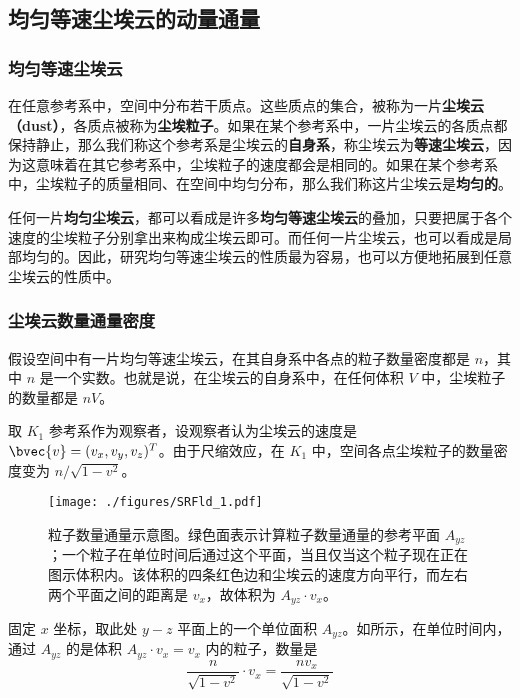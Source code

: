 



\subsection{均匀等速尘埃云的动量通量}

\subsubsection{均匀等速尘埃云}

在任意参考系中，空间中分布若干质点。这些质点的集合，被称为一片\textbf{尘埃云（dust）}，各质点被称为\textbf{尘埃粒子}。如果在某个参考系中，一片尘埃云的各质点都保持静止，那么我们称这个参考系是尘埃云的\textbf{自身系}，称尘埃云为\textbf{等速尘埃云}，因为这意味着在其它参考系中，尘埃粒子的速度都会是相同的。如果在某个参考系中，尘埃粒子的质量相同、在空间中均匀分布，那么我们称这片尘埃云是\textbf{均匀的}。

任何一片\textbf{均匀尘埃云}，都可以看成是许多\textbf{均匀等速尘埃云}的叠加，只要把属于各个速度的尘埃粒子分别拿出来构成尘埃云即可。而任何一片尘埃云，也可以看成是局部均匀的。因此，研究均匀等速尘埃云的性质最为容易，也可以方便地拓展到任意尘埃云的性质中。

\subsubsection{尘埃云数量通量密度}

假设空间中有一片均匀等速尘埃云，在其自身系中各点的粒子数量密度都是 $n$，其中 $n$ 是一个实数。也就是说，在尘埃云的自身系中，在任何体积 $V$ 中，尘埃粒子的数量都是 $nV$。

取 $K_1$ 参考系作为观察者，设观察者认为尘埃云的速度是 $\bvec{v}=(v_x, v_y, v_z)^T$。由于尺缩效应，在 $K_1$ 中，空间各点尘埃粒子的数量密度变为 $n/\sqrt{1-v^2}$。

\begin{figure}[ht]
\centering
\texttt{[image: ./figures/SRFld\_1.pdf]}
\caption{粒子数量通量示意图。绿色面表示计算粒子数量通量的参考平面 $A_{yz}$；一个粒子在单位时间后通过这个平面，当且仅当这个粒子现在正在图示体积内。该体积的四条红色边和尘埃云的速度方向平行，而左右两个平面之间的距离是 $v_x$，故体积为 $A_{yz}\cdot v_x$。} \label{SRFld_fig1}
\end{figure}

固定 $x$ 坐标，取此处 $y-z$ 平面上的一个单位面积 $A_{yz}$。如所示，在单位时间内，通过 $A_{yz}$ 的是体积 $A_{yz}\cdot v_x=v_x$ 内的粒子，数量是
\begin{equation}
\frac{n}{\sqrt{1-v^2}}\cdot v_x=\frac{nv_x}{\sqrt{1-v^2}}
\end{equation}

